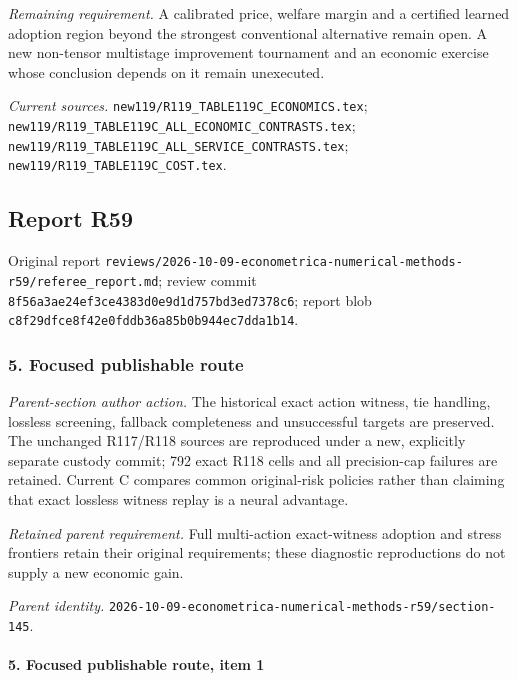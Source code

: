 \par\emph{Remaining requirement.} A calibrated price, welfare margin and a certified learned adoption region beyond the strongest conventional alternative remain open. A new non-tensor multistage improvement tournament and an economic exercise whose conclusion depends on it remain unexecuted.

\par\emph{Current sources.} \nolinkurl{new119/R119_TABLE119C_ECONOMICS.tex}; \nolinkurl{new119/R119_TABLE119C_ALL_ECONOMIC_CONTRASTS.tex}; \nolinkurl{new119/R119_TABLE119C_ALL_SERVICE_CONTRASTS.tex}; \nolinkurl{new119/R119_TABLE119C_COST.tex}.

\subsection{Report R59}

Original report \nolinkurl{reviews/2026-10-09-econometrica-numerical-methods-r59/referee_report.md}; review commit \nolinkurl{8f56a3ae24ef3ce4383d0e9d1d757bd3ed7378c6}; report blob \nolinkurl{c8f29dfce8f42e0fddb36a85b0b944ec7dda1b14}.

\subsubsection{5. Focused publishable route}

\emph{Parent-section author action.} The historical exact action witness, tie handling, lossless screening, fallback completeness and unsuccessful targets are preserved. The unchanged R117/R118 sources are reproduced under a new, explicitly separate custody commit; 792 exact R118 cells and all precision-cap failures are retained. Current C compares common original-risk policies rather than claiming that exact lossless witness replay is a neural advantage.

\par\emph{Retained parent requirement.} Full multi-action exact-witness adoption and stress frontiers retain their original requirements; these diagnostic reproductions do not supply a new economic gain.

\par\emph{Parent identity.} \nolinkurl{2026-10-09-econometrica-numerical-methods-r59/section-145}.

\paragraph{5. Focused publishable route, item 1}

